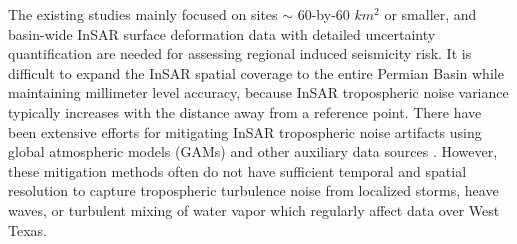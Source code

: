 The existing studies mainly focused on sites $ \sim $ 60-by-60 $km^2$ or smaller, and basin-wide InSAR surface deformation data with detailed uncertainty quantification are needed for assessing regional induced seismicity risk. It is difficult to expand the InSAR spatial coverage to the entire Permian Basin while maintaining millimeter level accuracy, because InSAR tropospheric noise variance typically increases with the distance away from a reference point. There have been extensive efforts for mitigating InSAR tropospheric noise artifacts using global atmospheric models (GAMs) and other auxiliary data sources \citep{Lauknes2011InsarTroposphericStratification, Bekaert2015SpatiallyVariablePower, Doin2009CorrectionsStratifiedTropospheric, Li2005InterferometricSyntheticAperture,Ding2008AtmosphericEffectsInsar}. However, these mitigation methods often do not have sufficient temporal and spatial resolution to capture tropospheric turbulence noise from localized storms, heave waves, or turbulent mixing of water vapor which regularly affect data over West Texas.

